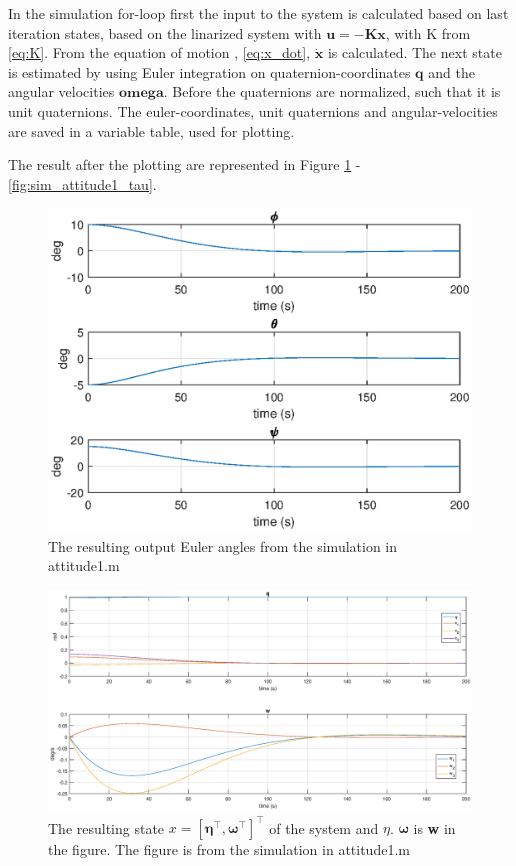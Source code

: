 In the simulation for-loop first the input to the system is calculated based on last iteration states, based on the linarized system with $\mathbf{u} = -\mathbf{K}\mathbf{x}$, with K from \eqref{eq:K}.  From the equation of motion , \eqref{eq:x_dot}, $\dot{\mathbf{x}}$ is calculated. The next state is estimated by using Euler integration on quaternion-coordinates $\mathbf{q}$ and the angular velocities $\mathbf{omega}$. Before the quaternions are normalized, such that it is unit quaternions. The euler-coordinates, unit quaternions and angular-velocities are saved in a variable table, used for plotting.

The result after the plotting are represented in Figure \ref{fig:sim_attitude1_euler} - \ref{fig:sim_attitude1_tau}. 

\begin{figure}[htb!]
	\centering
	\includegraphics[width=1.00\textwidth]{figures/1_euler.eps}
	\caption{The resulting output Euler angles from the simulation in attitude1.m}
\label{fig:sim_attitude1_euler}
\end{figure}

\begin{figure}[htb!]
	\centering
	\includegraphics[width=1.00\textwidth]{figures/1_q.eps}
	\caption{The resulting state $x = [\boldsymbol{\eta}^\top, \boldsymbol{\omega}^\top] ^\top$ of the system and $\eta$. $\boldsymbol{\omega}$ is \textbf{w} in the figure. The figure is from the simulation in attitude1.m}
\label{fig:sim_attitude1_q}
\end{figure}

